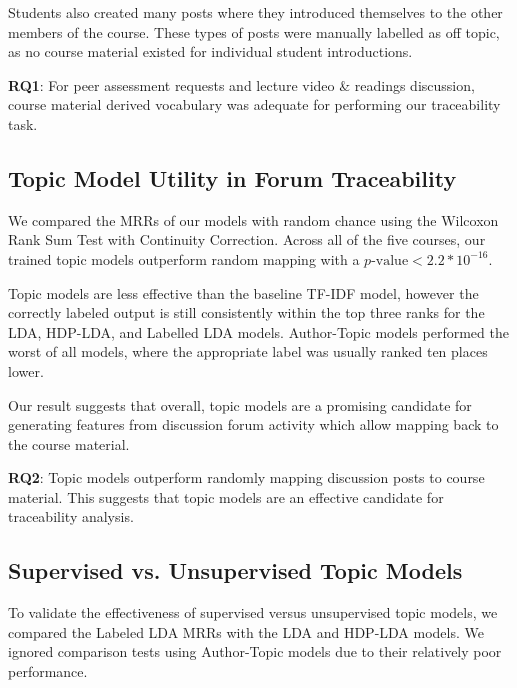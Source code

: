 \documentclass[sigconf, anonymous]{acmart}
\begin{document}
Students also created many posts where they introduced themselves to the other members of the course. 
These types of posts were manually labelled as off topic, as no course material existed for individual student introductions.

\begin{tcolorbox}[sharp corners, top=1mm, bottom=1mm]
\textbf{RQ1}: For peer assessment requests and lecture video \& readings discussion, course material derived vocabulary was adequate for performing our traceability task.
\end{tcolorbox}

\subsection{Topic Model Utility in Forum Traceability}
We compared the MRRs of our models with random chance using the Wilcoxon Rank Sum Test with Continuity Correction.
Across all of the five courses, our trained topic models outperform random mapping with a $p\text{-value} < 2.2 * 10^{-16}$.

Topic models are less effective than the baseline TF-IDF model, however the correctly labeled output is still consistently within the top three ranks for the LDA, HDP-LDA, and Labelled LDA models. Author-Topic models performed the worst of all models, where the appropriate label was usually ranked ten places lower. %

Our result suggests that overall, topic models are a promising candidate for generating features from discussion forum activity which allow mapping back to the course material. %


\begin{tcolorbox}[sharp corners, top=1mm, bottom=1mm]
\textbf{RQ2}: Topic models outperform randomly mapping discussion posts to course material. This suggests that topic models are an effective candidate for traceability analysis.
\end{tcolorbox}

\subsection{Supervised vs. Unsupervised Topic Models}

To validate the effectiveness of supervised versus unsupervised topic models, we compared the Labeled LDA MRRs with the LDA and HDP-LDA models.
We ignored comparison tests using Author-Topic models due to their relatively poor performance.
\end{document}
